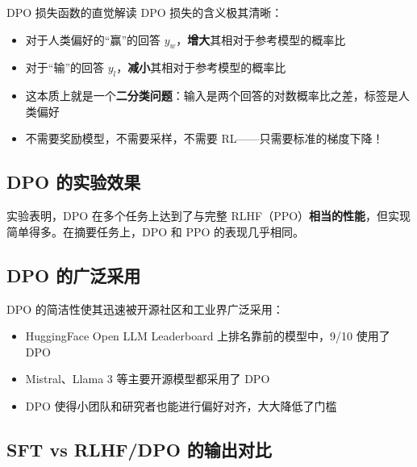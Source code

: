\documentclass[a4paper]{article}
\begin{document}
\begin{importantbox}{DPO 损失函数的直觉解读}
DPO 损失的含义极其清晰：
\begin{itemize}
    \item 对于人类偏好的``赢''的回答 $y_w$，\textbf{增大}其相对于参考模型的概率比
    \item 对于``输''的回答 $y_l$，\textbf{减小}其相对于参考模型的概率比
    \item 这本质上就是一个\textbf{二分类问题}：输入是两个回答的对数概率比之差，标签是人类偏好
    \item 不需要奖励模型，不需要采样，不需要 RL——只需要标准的梯度下降！
\end{itemize}
\end{importantbox}

\subsection{DPO 的实验效果}





实验表明，DPO 在多个任务上达到了与完整 RLHF（PPO）\textbf{相当的性能}，但实现简单得多。在摘要任务上，DPO 和 PPO 的表现几乎相同。

\subsection{DPO 的广泛采用}

DPO 的简洁性使其迅速被开源社区和工业界广泛采用：





\begin{itemize}
    \item HuggingFace Open LLM Leaderboard 上排名靠前的模型中，9/10 使用了 DPO
    \item Mistral、Llama 3 等主要开源模型都采用了 DPO
    \item DPO 使得小团队和研究者也能进行偏好对齐，大大降低了门槛
\end{itemize}





\subsection{SFT vs RLHF/DPO 的输出对比}
\end{document}
